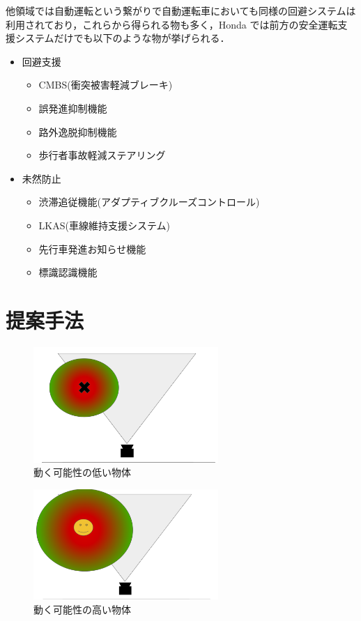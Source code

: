 \documentclass[uplatex,a4j,10pt]{jsarticle}
\begin{document}
他領域では自動運転という繋がりで自動運転車においても同様の回避システムは利用されており，これらから得られる物も多く，Honda\cite{Honda} では前方の安全運転支援システムだけでも以下のような物が挙げられる．

\begin{itemize}
\item 回避支援
  \begin{itemize}
    \item CMBS(衝突被害軽減ブレーキ)
    \item 誤発進抑制機能
    \item 路外逸脱抑制機能
    \item 歩行者事故軽減ステアリング
  \end{itemize}
\item 未然防止
  \begin{itemize}
    \item 渋滞追従機能(アダプティブクルーズコントロール)
    \item LKAS(車線維持支援システム)
    \item 先行車発進お知らせ機能
    \item 標識認識機能
  \end{itemize}
\end{itemize}


\section{提案手法}


\begin{figure}[htbp]
  \includegraphics[width=7cm]{img/figure1.png}
  \caption{動く可能性の低い物体}
\end{figure}
\begin{figure}[htbp]
  \includegraphics[width=7cm]{img/figure2.png}
  \caption{動く可能性の高い物体}
\end{figure}
\end{document}
